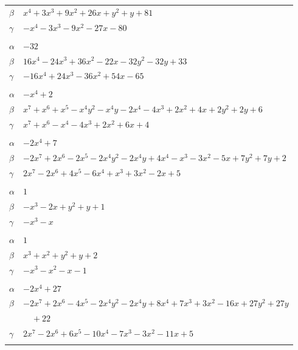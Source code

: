 \documentclass[11pt]{article}
\begin{document}
\begin{longtable}{@{}ll@{}}
$\beta$ & $x^{4}+3x^{3}+9x^{2}+26x+y^{2}+y+81$\\
$\gamma$ & $-x^{4}-3x^{3}-9x^{2}-27x-80$\\
\addlinespace[3pt]
\multicolumn{2}{@{}l}{$\{i,j\}=\{5,17\}$, $k_{ij}=5\cdot 7$}\\
$\alpha$ & $-32$\\
$\beta$ & $16x^{4}-24x^{3}+36x^{2}-22x-32y^{2}-32y+33$\\
$\gamma$ & $-16x^{4}+24x^{3}-36x^{2}+54x-65$\\
\addlinespace[3pt]
\multicolumn{2}{@{}l}{$\{i,j\}=\{5,20\}$, $k_{ij}=2\cdot 7$}\\
$\alpha$ & $-x^{4}+2$\\
$\beta$ & $x^{7}+x^{6}+x^{5}-x^{4}y^{2}-x^{4}y-2x^{4}-4x^{3}+2x^{2}+4x+2y^{2}+2y+6$\\
$\gamma$ & $x^{7}+x^{6}-x^{4}-4x^{3}+2x^{2}+6x+4$\\
\addlinespace[3pt]
\multicolumn{2}{@{}l}{$\{i,j\}=\{5,24\}$, $k_{ij}=2\cdot 3\cdot 5$}\\
$\alpha$ & $-2x^{4}+7$\\
$\beta$ & $-2x^{7}+2x^{6}-2x^{5}-2x^{4}y^{2}-2x^{4}y+4x^{4}-x^{3}-3x^{2}-5x+7y^{2}+7y+2$\\
$\gamma$ & $2x^{7}-2x^{6}+4x^{5}-6x^{4}+x^{3}+3x^{2}-2x+5$\\
\addlinespace[3pt]
\multicolumn{2}{@{}l}{$\{i,j\}=\{5,26\}$, $k_{ij}=5$}\\
$\alpha$ & $1$\\
$\beta$ & $-x^{3}-2x+y^{2}+y+1$\\
$\gamma$ & $-x^{3}-x$\\
\addlinespace[3pt]
\multicolumn{2}{@{}l}{$\{i,j\}=\{5,29\}$, $k_{ij}=5$}\\
$\alpha$ & $1$\\
$\beta$ & $x^{3}+x^{2}+y^{2}+y+2$\\
$\gamma$ & $-x^{3}-x^{2}-x-1$\\
\addlinespace[3pt]
\multicolumn{2}{@{}l}{$\{i,j\}=\{5,32\}$, $k_{ij}=5^{3}$}\\
$\alpha$ & $-2x^{4}+27$\\
$\beta$ & $-2x^{7}+2x^{6}-4x^{5}-2x^{4}y^{2}-2x^{4}y+8x^{4}+7x^{3}+3x^{2}-16x+27y^{2}+27y$\\
 & $\quad +22$\\
$\gamma$ & $2x^{7}-2x^{6}+6x^{5}-10x^{4}-7x^{3}-3x^{2}-11x+5$\\
\addlinespace[3pt]
\multicolumn{2}{@{}l}{$\{i,j\}=\{5,33\}$, $k_{ij}=5^{2}\cdot 7$}\\

\end{longtable}
\end{document}
